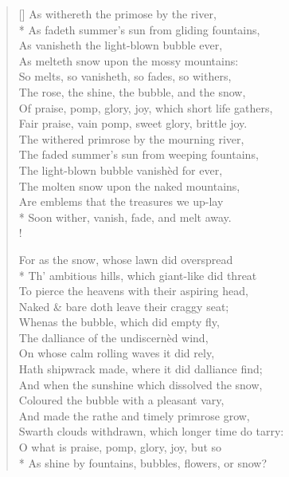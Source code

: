 \documentclass[MAIN]{subfiles}
\begin{document}
\settowidth{\versewidth}{The rose, the shine, the bubble, and the snow,}
\begin{verse}[\versewidth]
As withereth the primose by the river,\\*
As fadeth summer's sun from gliding fountains,\\
As vanisheth the light-blown bubble ever,\\
As melteth snow upon the mossy mountains:\\
So melts, so vanisheth, so fades, so withers,\\
The rose, the shine, the bubble, and the snow,\\
Of praise, pomp, glory, joy, which short life gathers,\\
Fair praise, vain pomp, sweet glory, brittle joy.\\
The withered primrose by the mourning river,\\
The faded summer's sun from weeping fountains,\\
The light-blown bubble vanish\`ed for ever,\\
The molten snow upon the naked mountains,\\
\vin Are emblems that the treasures we up-lay\\*
\vin Soon wither, vanish, fade, and melt away.\\!

For as the snow, whose lawn did overspread\\*
Th' ambitious hills, which giant-like did threat\\
To pierce the heavens with their aspiring head,\\
Naked \& bare doth leave their craggy seat;\\
Whenas the bubble, which did empty fly,\\
The dalliance of the undiscern\`ed wind,\\
On whose calm rolling waves it did rely,\\
Hath shipwrack made, where it did dalliance find;\\
And when the sunshine which dissolved the snow,\\
Coloured the bubble with a pleasant vary,\\
And made the rathe and timely primrose grow,\\
Swarth clouds withdrawn, which longer time do tarry:\\
\vin O what is praise, pomp, glory, joy, but so\\*
\vin As shine by fountains, bubbles, flowers, or snow?
\end{verse}
\end{document}
